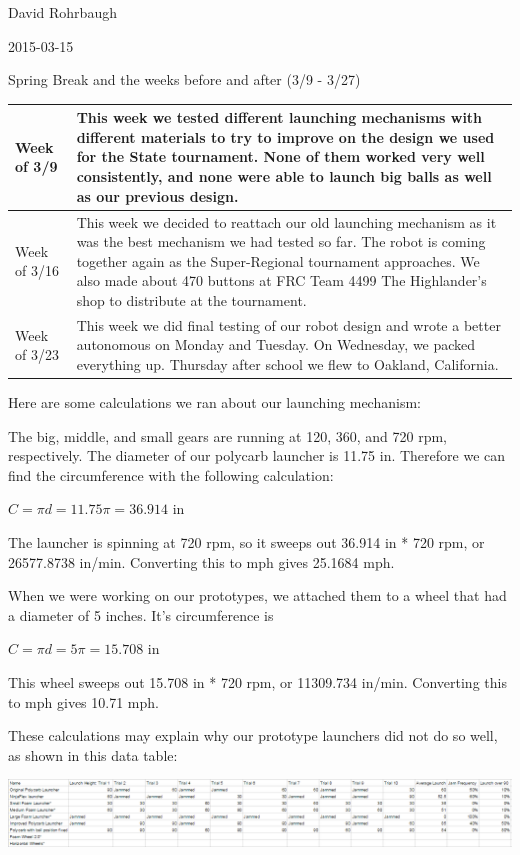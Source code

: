 David Rohrbaugh

2015-03-15

Spring Break and the weeks before and after (3/9 - 3/27)

\begin{tabular}{|p{5cm}|p{5cm}|}
 \hline
 Week of 3/9&
 This week we tested different launching mechanisms with different materials to try to improve on the design we used for the State tournament. None of them worked very well consistently, and none were able to launch big balls as well as our previous design.\\
\hline
 Week of 3/16&
 This week we decided to reattach our old launching mechanism as it was the best mechanism we had tested so far. The robot is coming together again as the Super-Regional tournament approaches. We also made about 470 buttons at FRC Team 4499 The Highlander's shop to distribute at the tournament.\\
\hline
 Week of 3/23&
 This week we did final testing of our robot design and wrote a better autonomous on Monday and Tuesday. On Wednesday, we packed everything up. Thursday after school we flew to Oakland, California.\\
 \hline
\end{tabular}

\medskip

Here are some calculations we ran about our launching mechanism:

The big, middle, and small gears are running at 120, 360, and 720 rpm, respectively. The diameter of our polycarb launcher is 11.75 in. Therefore we can find the circumference with the following calculation:

$C = \pi d = 11.75\pi = 36.914$ in

The launcher is spinning at 720 rpm, so it sweeps out 36.914 in * 720 rpm, or 26577.8738 in/min. Converting this to mph gives 25.1684 mph.

When we were working on our prototypes, we attached them to a wheel that had a diameter of 5 inches. It's circumference is

$C = \pi d = 5\pi = 15.708$ in

This wheel sweeps out 15.708 in * 720 rpm, or 11309.734 in/min. Converting this to mph gives 10.71 mph.

These calculations may explain why our prototype launchers did not do so well, as shown in this data table:

\begin{center}
 \includegraphics[width=\textwidth]{./Entries/Images/launchData.png}
\end{center}

